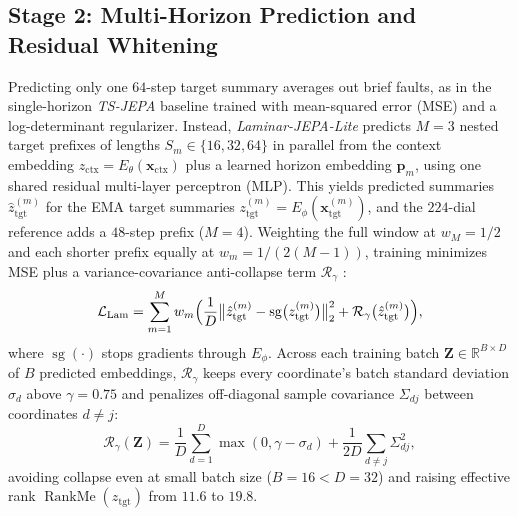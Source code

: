\subsection{Stage 2: Multi-Horizon Prediction and Residual Whitening}
\label{subsec:triad_formulations}
Predicting only one $64$-step target summary averages out brief faults, as in the single-horizon \emph{TS-JEPA} baseline trained with mean-squared error (MSE) and a log-determinant regularizer. Instead, \emph{Laminar-JEPA-Lite} predicts $M=3$ nested target prefixes of lengths $S_m \in \{16, 32, 64\}$ in parallel from the context embedding $z_{\text{ctx}} = E_\theta(\mathbf{x}_{\text{ctx}})$ plus a learned horizon embedding $\mathbf{p}_m$, using one shared residual multi-layer perceptron (MLP). This yields predicted summaries $\hat{z}_{\text{tgt}}^{(m)}$ for the EMA target summaries $z_{\text{tgt}}^{(m)} = E_\phi(\mathbf{x}_{\text{tgt}}^{(m)})$, and the $224$-dial reference adds a $48$-step prefix ($M=4$). Weighting the full window at $w_M=1/2$ and each shorter prefix equally at $w_m=1/(2(M-1))$, training minimizes MSE plus a variance-covariance anti-collapse term $\mathcal{R}_\gamma$ \cite{bardes2021vicreg}:
\begin{equation}
    \mathcal{L}_{\text{Lam}} = \sum_{m=1}^M w_m \Bigl(\frac{1}{D}\bigl\|\hat{z}_{\text{tgt}}^{(m)} - \operatorname{sg}\bigl(z_{\text{tgt}}^{(m)}\bigr)\bigr\|_2^2 + \mathcal{R}_\gamma\bigl(\hat{z}_{\text{tgt}}^{(m)}\bigr)\Bigr),
    \label{eq:laminar_loss}
\end{equation}
where $\operatorname{sg}(\cdot)$ stops gradients through $E_\phi$. Across each training batch $\mathbf{Z} \in \mathbb{R}^{B \times D}$ of $B$ predicted embeddings, $\mathcal{R}_\gamma$ keeps every coordinate's batch standard deviation $\sigma_d$ above $\gamma=0.75$ and penalizes off-diagonal sample covariance $\Sigma_{dj}$ between coordinates $d \neq j$:
\begin{equation}
    \mathcal{R}_\gamma(\mathbf{Z}) = \frac{1}{D}\sum_{d=1}^D \max(0, \gamma - \sigma_d) + \frac{1}{2D}\sum_{d\neq j} \Sigma_{dj}^2 ,
\end{equation}
avoiding collapse even at small batch size ($B=16 < D=32$) and raising effective rank $\operatorname{RankMe}(z_{\text{tgt}})$ \cite{garrido2023rankme} from $11.6$ to $19.8$.

